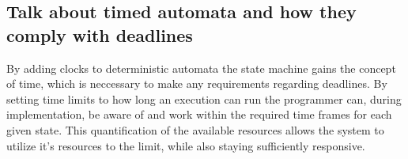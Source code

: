 \subsection{Talk about timed automata and how they comply with deadlines}
By adding clocks to deterministic automata the state machine gains the concept of time, which is neccessary to make any requirements regarding deadlines. By setting time limits to how long an execution can run the programmer can, during implementation, be aware of and work within the required time frames for each given state. This quantification of the available resources allows the system to utilize it's resources to the limit, while also staying sufficiently responsive. 

